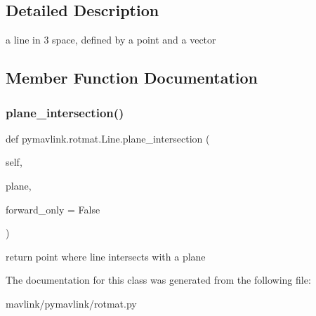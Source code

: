 \subsection{Detailed Description}
\begin{DoxyVerb}a line in 3 space, defined by a point and a vector\end{DoxyVerb}
 

\subsection{Member Function Documentation}
\mbox{\label{classpymavlink_1_1rotmat_1_1Line_a798d84ee7809f0fd49a80421776f78b4}} 
\subsubsection{\texorpdfstring{plane\+\_\+intersection()}{plane\_intersection()}}
{\footnotesize\ttfamily def pymavlink.\+rotmat.\+Line.\+plane\+\_\+intersection (\begin{DoxyParamCaption}\item[{}]{self,  }\item[{}]{plane,  }\item[{}]{forward\+\_\+only = {\ttfamily False} }\end{DoxyParamCaption})}

\begin{DoxyVerb}return point where line intersects with a plane\end{DoxyVerb}
 

The documentation for this class was generated from the following file\+:\begin{DoxyCompactItemize}
\item 
mavlink/pymavlink/rotmat.\+py\end{DoxyCompactItemize}
